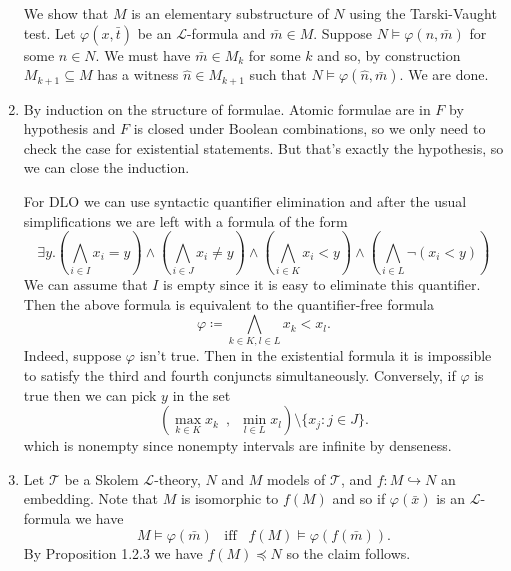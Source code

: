 \documentclass{article}
\begin{document}
\begin{enumerate}[leftmargin=*]
		We show that $M$ is an elementary substructure of $N$ using the Tarski-Vaught test. Let $\varphi(x,\bar{t})$ be an $\mathcal{L}$-formula  and $\bar{m}\in M$. Suppose $N \models \varphi(n, \bar{m})$ for some $n\in N$. We must have $\bar{m}\in M_k$ for some $k$ and so, by construction $M_{k+1}\subseteq M$ has a witness $\hat{n}\in M_{k+1}$ such that $N \models \varphi(\hat{n},\bar{m})$. We are done.
		
		\item By induction on the structure of formulae. Atomic formulae are in $F$ by hypothesis and $F$ is closed under Boolean combinations, so we only need to check the case for existential statements. But that's exactly the hypothesis, so we can close the induction.
		
		For DLO we can use syntactic quantifier elimination and after the usual simplifications we are left with a formula of the form
		\[
			\exists y. \left(\bigwedge_{i\in I} x_i = y\right) \wedge \left(\bigwedge_{i\in J} x_i \neq y\right) \wedge \left(\bigwedge_{i\in K} x_i < y\right) \wedge \left(\bigwedge_{i\in L} \neg(x_i < y)\right)
		\]
		We can assume that $I$ is empty since it is easy to eliminate this quantifier. Then the above formula is equivalent to the quantifier-free formula
		\[
			\varphi \coloneqq \bigwedge_{k\in K,l\in L} x_k < x_l.
		\] 
		Indeed, suppose $\varphi$ isn't true. Then in the existential formula it is impossible to satisfy the third and fourth conjuncts simultaneously. Conversely, if $\varphi$ is true then we can pick $y$ in the set
		\[
			\left(\max_{k\in K}x_k \,\,\,,\,\,\, \min_{l\in L} x_l\right) \setminus\{x_j \colon j\in J\}.
		\]
		which is nonempty since nonempty intervals are infinite by denseness.
		\item Let $\mathcal{T}$ be a Skolem $\mathcal{L}$-theory, $N$ and $M$ models of $\mathcal{T}$, and $f\colon M \hookrightarrow N$ an embedding. Note that $M$ is isomorphic to $f(M)$ and so if $\varphi(\bar{x})$ is an $\mathcal{L}$-formula we have
		\[
			M \models \varphi(\bar{m}) \,\,\,\text{ iff }\,\,\, f(M)\models \varphi(f(\bar{m})).
		\]
		By Proposition 1.2.3 we have $f(M) \preccurlyeq N$ so the claim follows. 
		

\end{enumerate}
\end{document}
